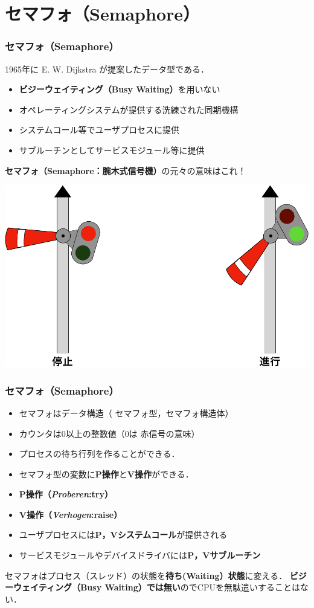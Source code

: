 \documentclass{beamer}                   %
\begin{document}
\section{セマフォ（Semaphore）}
\begin{frame}
  \frametitle{セマフォ（Semaphore）}
  1965年に E. W. Dijkstra が提案したデータ型である．
  \begin{itemize}
  \item {\bf ビジーウェイティング（Busy Waiting）}を用いない
  \item オペレーティングシステムが提供する洗練された同期機構
  \item システムコール等でユーザプロセスに提供
  \item サブルーチンとしてサービスモジュール等に提供
  \end{itemize}

{\bf セマフォ（Semaphore：腕木式信号機）}の元々の意味はこれ！

\begin{center}
\includegraphics[scale=0.35]{Fig/semaphore-crop.pdf}
\end{center}
\end{frame}

\begin{frame}
  \frametitle{セマフォ（Semaphore）}
  \begin{itemize}
  \item セマフォはデータ構造（{\color{red} セマフォ型}，セマフォ構造体）
  \item カウンタは0以上の整数値（0は{\color{red} 赤信号}の意味）
  \item プロセスの待ち行列を作ることができる．
  \item セマフォ型の変数に{\bf P操作}と{\bf V操作}ができる．
  \item {\bf P操作（{\it Proberen}:try）}
  \item {\bf V操作（{\it Verhogen}:raise）}
  \item ユーザプロセスには{\bf P，Vシステムコール}が提供される
  \item サービスモジュールやデバイスドライバには{\bf P，Vサブルーチン}
  \end{itemize}

セマフォはプロセス（スレッド）の状態を{\bf 待ち(Waiting）状態}に変える．
{\bf ビジーウェイティング（Busy Waiting）では無い}のでCPUを無駄遣いすることはない．
\end{frame}
\end{document}
